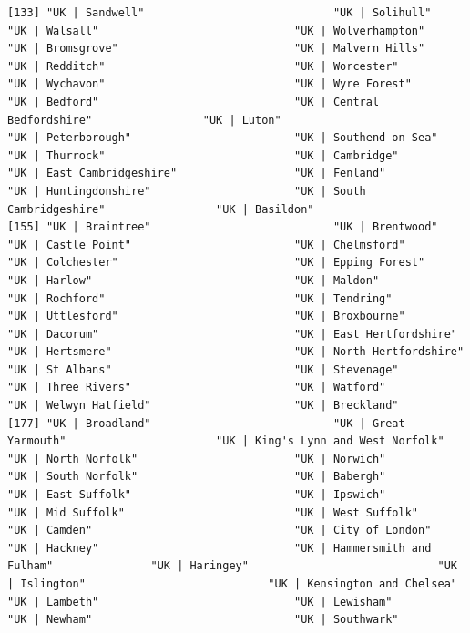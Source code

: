 \documentclass[11pt]{article}
\begin{document}
\begin{verbatim}
[133] "UK | Sandwell"                             "UK | Solihull"                             "UK | Walsall"                              "UK | Wolverhampton"                        "UK | Bromsgrove"                           "UK | Malvern Hills"                        "UK | Redditch"                             "UK | Worcester"                            "UK | Wychavon"                             "UK | Wyre Forest"                          "UK | Bedford"                              "UK | Central Bedfordshire"                 "UK | Luton"                                "UK | Peterborough"                         "UK | Southend-on-Sea"                      "UK | Thurrock"                             "UK | Cambridge"                            "UK | East Cambridgeshire"                  "UK | Fenland"                              "UK | Huntingdonshire"                      "UK | South Cambridgeshire"                 "UK | Basildon"                            
[155] "UK | Braintree"                            "UK | Brentwood"                            "UK | Castle Point"                         "UK | Chelmsford"                           "UK | Colchester"                           "UK | Epping Forest"                        "UK | Harlow"                               "UK | Maldon"                               "UK | Rochford"                             "UK | Tendring"                             "UK | Uttlesford"                           "UK | Broxbourne"                           "UK | Dacorum"                              "UK | East Hertfordshire"                   "UK | Hertsmere"                            "UK | North Hertfordshire"                  "UK | St Albans"                            "UK | Stevenage"                            "UK | Three Rivers"                         "UK | Watford"                              "UK | Welwyn Hatfield"                      "UK | Breckland"                           
[177] "UK | Broadland"                            "UK | Great Yarmouth"                       "UK | King's Lynn and West Norfolk"         "UK | North Norfolk"                        "UK | Norwich"                              "UK | South Norfolk"                        "UK | Babergh"                              "UK | East Suffolk"                         "UK | Ipswich"                              "UK | Mid Suffolk"                          "UK | West Suffolk"                         "UK | Camden"                               "UK | City of London"                       "UK | Hackney"                              "UK | Hammersmith and Fulham"               "UK | Haringey"                             "UK | Islington"                            "UK | Kensington and Chelsea"               "UK | Lambeth"                              "UK | Lewisham"                             "UK | Newham"                               "UK | Southwark"                           

\end{verbatim}
\end{document}
